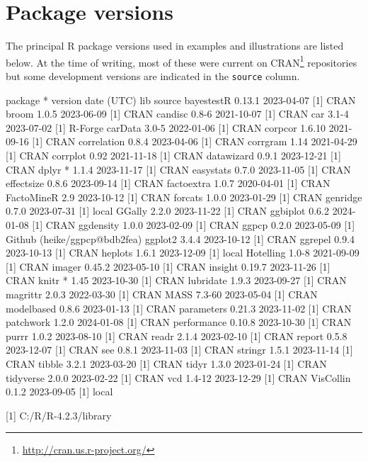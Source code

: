 \documentclass[
  letterpaper,
  10pt,
  krantz2]{krantz}
\providecommand{\href}[2]{#2\footnote{\url{#1}}}
\begin{document}
\hypertarget{package-versions}{%
\section*{Package versions}\label{package-versions}}


The principal R package versions used in examples and illustrations are
listed below. At the time of writing, most of these were current on
\href{http://cran.us.r-project.org/}{CRAN} repositories but some
development versions are indicated in the \texttt{source} column.

package * version date (UTC) lib source bayestestR 0.13.1 2023-04-07
{[}1{]} CRAN broom 1.0.5 2023-06-09 {[}1{]} CRAN candisc 0.8-6
2021-10-07 {[}1{]} CRAN car 3.1-4 2023-07-02 {[}1{]} R-Forge carData
3.0-5 2022-01-06 {[}1{]} CRAN corpcor 1.6.10 2021-09-16 {[}1{]} CRAN
correlation 0.8.4 2023-04-06 {[}1{]} CRAN corrgram 1.14 2021-04-29
{[}1{]} CRAN corrplot 0.92 2021-11-18 {[}1{]} CRAN datawizard 0.9.1
2023-12-21 {[}1{]} CRAN dplyr * 1.1.4 2023-11-17 {[}1{]} CRAN easystats
0.7.0 2023-11-05 {[}1{]} CRAN effectsize 0.8.6 2023-09-14 {[}1{]} CRAN
factoextra 1.0.7 2020-04-01 {[}1{]} CRAN FactoMineR 2.9 2023-10-12
{[}1{]} CRAN forcats 1.0.0 2023-01-29 {[}1{]} CRAN genridge 0.7.0
2023-07-31 {[}1{]} local GGally 2.2.0 2023-11-22 {[}1{]} CRAN ggbiplot
0.6.2 2024-01-08 {[}1{]} CRAN ggdensity 1.0.0 2023-02-09 {[}1{]} CRAN
ggpcp 0.2.0 2023-05-09 {[}1{]} Github (heike/ggpcp@bdb2fea) ggplot2
3.4.4 2023-10-12 {[}1{]} CRAN ggrepel 0.9.4 2023-10-13 {[}1{]} CRAN
heplots 1.6.1 2023-12-09 {[}1{]} local Hotelling 1.0-8 2021-09-09
{[}1{]} CRAN imager 0.45.2 2023-05-10 {[}1{]} CRAN insight 0.19.7
2023-11-26 {[}1{]} CRAN knitr * 1.45 2023-10-30 {[}1{]} CRAN lubridate
1.9.3 2023-09-27 {[}1{]} CRAN magrittr 2.0.3 2022-03-30 {[}1{]} CRAN
MASS 7.3-60 2023-05-04 {[}1{]} CRAN modelbased 0.8.6 2023-01-13 {[}1{]}
CRAN parameters 0.21.3 2023-11-02 {[}1{]} CRAN patchwork 1.2.0
2024-01-08 {[}1{]} CRAN performance 0.10.8 2023-10-30 {[}1{]} CRAN purrr
1.0.2 2023-08-10 {[}1{]} CRAN readr 2.1.4 2023-02-10 {[}1{]} CRAN report
0.5.8 2023-12-07 {[}1{]} CRAN see 0.8.1 2023-11-03 {[}1{]} CRAN stringr
1.5.1 2023-11-14 {[}1{]} CRAN tibble 3.2.1 2023-03-20 {[}1{]} CRAN tidyr
1.3.0 2023-01-24 {[}1{]} CRAN tidyverse 2.0.0 2023-02-22 {[}1{]} CRAN
vcd 1.4-12 2023-12-29 {[}1{]} CRAN VisCollin 0.1.2 2023-09-05 {[}1{]}
local

{[}1{]} C:/R/R-4.2.3/library



\backmatter
\printindex
\end{document}

